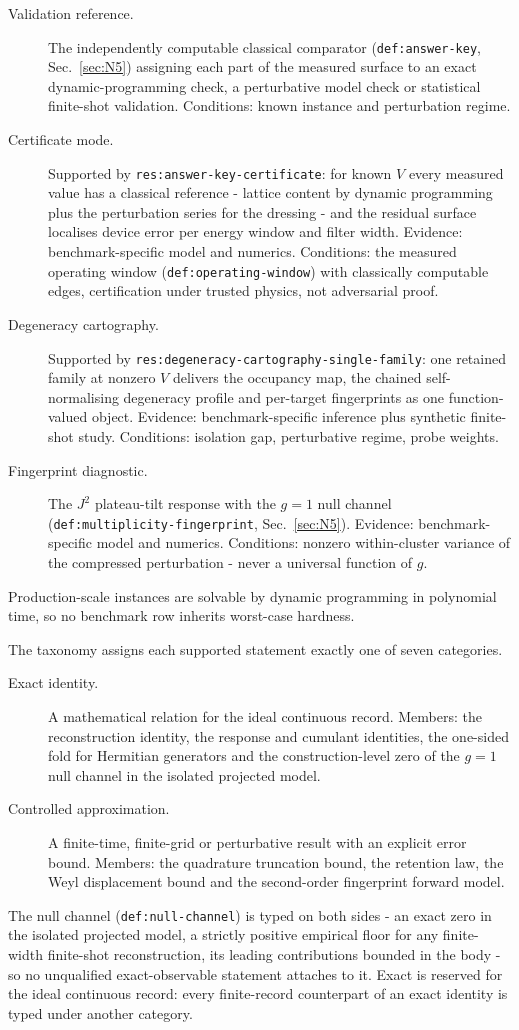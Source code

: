 \begin{description}
\item[Validation reference.] The independently computable classical comparator (\texttt{def:answer-key}, Sec.~\ref{sec:N5}) assigning each part of the measured surface to an exact dynamic-programming check, a perturbative model check or statistical finite-shot validation. Conditions: known instance and perturbation regime.
\item[Certificate mode.] Supported by \texttt{res:answer-key-certificate}: for known $V$ every measured value has a classical reference - lattice content by dynamic programming \cite{bellman1957dp} plus the perturbation series for the dressing - and the residual surface localises device error per energy window and filter width. Evidence: benchmark-specific model and numerics. Conditions: the measured operating window (\texttt{def:operating-window}) with classically computable edges, certification under trusted physics, not adversarial proof.
\item[Degeneracy cartography.] Supported by \texttt{res:degeneracy-cartography-single-family}: one retained family at nonzero $V$ delivers the occupancy map, the chained self-normalising degeneracy profile and per-target fingerprints as one function-valued object. Evidence: benchmark-specific inference plus synthetic finite-shot study. Conditions: isolation gap, perturbative regime, probe weights.
\item[Fingerprint diagnostic.] The $J^{2}$ plateau-tilt response with the $g=1$ null channel (\texttt{def:multiplicity-fingerprint}, Sec.~\ref{sec:N5}). Evidence: benchmark-specific model and numerics. Conditions: nonzero within-cluster variance of the compressed perturbation - never a universal function of $g$.
\end{description}
Production-scale instances are solvable by dynamic programming in polynomial time, so no benchmark row inherits worst-case hardness.

The taxonomy assigns each supported statement exactly one of seven categories.
\begin{description}
\item[Exact identity.] A mathematical relation for the ideal continuous record. Members: the reconstruction identity, the response and cumulant identities, the one-sided fold for Hermitian generators and the construction-level zero of the $g=1$ null channel in the isolated projected model.
\item[Controlled approximation.] A finite-time, finite-grid or perturbative result with an explicit error bound. Members: the quadrature truncation bound, the retention law, the Weyl displacement bound and the second-order fingerprint forward model.
\end{description}
The null channel (\texttt{def:null-channel}) is typed on both sides - an exact zero in the isolated projected model, a strictly positive empirical floor for any finite-width finite-shot reconstruction, its leading contributions bounded in the body - so no unqualified exact-observable statement attaches to it. Exact is reserved for the ideal continuous record: every finite-record counterpart of an exact identity is typed under another category.

